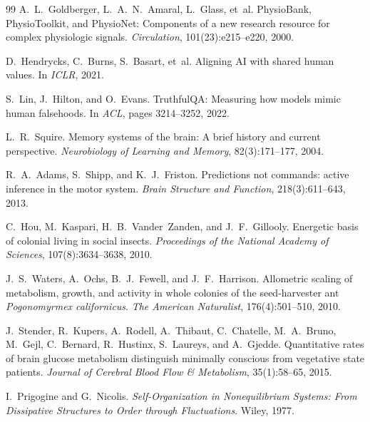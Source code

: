 \documentclass[12pt]{book}
\begin{document}
\begin{thebibliography}{99}
A.~L.~Goldberger, L.~A.~N.~Amaral, L.~Glass, et~al.
\newblock PhysioBank, PhysioToolkit, and PhysioNet: Components of a new research resource for complex physiologic signals.
\newblock \textit{Circulation}, 101(23):e215--e220, 2000.

D.~Hendrycks, C.~Burns, S.~Basart, et~al.
\newblock Aligning AI with shared human values.
\newblock In \textit{ICLR}, 2021.

S.~Lin, J.~Hilton, and O.~Evans.
\newblock TruthfulQA: Measuring how models mimic human falsehoods.
\newblock In \textit{ACL}, pages 3214--3252, 2022.

L.~R.~Squire.
\newblock Memory systems of the brain: A brief history and current perspective.
\newblock \textit{Neurobiology of Learning and Memory}, 82(3):171--177, 2004.

R.~A.~Adams, S.~Shipp, and K.~J.~Friston.
\newblock Predictions not commands: active inference in the motor system.
\newblock \textit{Brain Structure and Function}, 218(3):611--643, 2013.

C.~Hou, M.~Kaspari, H.~B.~Vander~Zanden, and J.~F.~Gillooly.
\newblock Energetic basis of colonial living in social insects.
\newblock \textit{Proceedings of the National Academy of Sciences}, 107(8):3634--3638, 2010.

J.~S.~Waters, A.~Ochs, B.~J.~Fewell, and J.~F.~Harrison.
\newblock Allometric scaling of metabolism, growth, and activity in whole colonies of the seed-harvester ant \textit{Pogonomyrmex californicus}.
\newblock \textit{The American Naturalist}, 176(4):501--510, 2010.

J.~Stender, R.~Kupers, A.~Rodell, A.~Thibaut, C.~Chatelle, M.~A.~Bruno, M.~Gejl, C.~Bernard, R.~Hustinx, S.~Laureys, and A.~Gjedde.
\newblock Quantitative rates of brain glucose metabolism distinguish minimally conscious from vegetative state patients.
\newblock \textit{Journal of Cerebral Blood Flow \& Metabolism}, 35(1):58--65, 2015.

I.~Prigogine and G.~Nicolis.
\newblock \textit{Self-Organization in Nonequilibrium Systems: From Dissipative Structures to Order through Fluctuations}.
\newblock Wiley, 1977.

\end{thebibliography}
\end{document}
